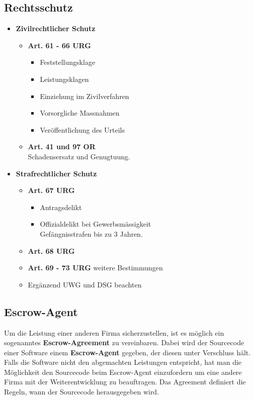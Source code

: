 \subsection{Rechtsschutz}

\begin{itemize}
	\item \textbf{Zivilrechtlicher Schutz}
	\begin{itemize}
		\item \textbf{Art. 61 - 66 URG}
		\begin{itemize}
			\item Feststellungsklage
			\item Leistungsklagen
			\item Einziehung im Zivilverfahren
			\item Vorsorgliche Massnahmen
			\item Veröffentlichung des Urteils
		\end{itemize}
		\item \textbf{Art. 41 und 97 OR}\\
		Schadensersatz und Genugtuung.
	\end{itemize}
	\item \textbf{Strafrechtlicher Schutz}
	\begin{itemize}
		\item \textbf{Art. 67 URG}
		\begin{itemize}
			\item Antragsdelikt
			\item Offizialdelikt bei Gewerbsmässigkeit\\
			Gefängnisstrafen bis zu 3 Jahren.
		\end{itemize}
		\item \textbf{Art. 68 URG}
		\item \textbf{Art. 69 - 73 URG} weitere Bestimmungen
		\item Ergänzend UWG und DSG beachten
	\end{itemize}
\end{itemize}

\subsection{Escrow-Agent}
Um die Leistung einer anderen Firma sicherzustellen, ist es möglich ein
sogenanntes \textbf{Escrow-Agreement} zu vereinbaren. Dabei wird der
Sourcecode einer Software einem \textbf{Escrow-Agent} gegeben, der diesen
unter Verschluss hält. Falls die Software nicht den abgemachten Leistungen
entspricht, hat man die Möglichkeit den Sourcecode beim Escrow-Agent
einzufordern um eine andere Firma mit der Weiterentwicklung zu beauftragen.
Das Agreement definiert die Regeln, wann der Sourcecode herausgegeben wird.
